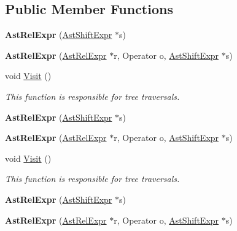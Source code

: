 \subsection*{Public Member Functions}
\begin{DoxyCompactItemize}
\item 
\hypertarget{classAstRelExpr_a17bddafe8d750f50ae41eb9c87410b1e}{{\bfseries Ast\-Rel\-Expr} (\hyperlink{classAstShiftExpr}{Ast\-Shift\-Expr} $\ast$s)}\label{classAstRelExpr_a17bddafe8d750f50ae41eb9c87410b1e}

\item 
\hypertarget{classAstRelExpr_a7a8c51e92d85456cd8da5b426f6958cf}{{\bfseries Ast\-Rel\-Expr} (\hyperlink{classAstRelExpr}{Ast\-Rel\-Expr} $\ast$r, Operator o, \hyperlink{classAstShiftExpr}{Ast\-Shift\-Expr} $\ast$s)}\label{classAstRelExpr_a7a8c51e92d85456cd8da5b426f6958cf}

\item 
void \hyperlink{classAstRelExpr_ae1a3ad7c0ce7a205222ec0b1de5ee884}{Visit} ()
\begin{DoxyCompactList}\small\item\em This function is responsible for tree traversals. \end{DoxyCompactList}\item 
\hypertarget{classAstRelExpr_a17bddafe8d750f50ae41eb9c87410b1e}{{\bfseries Ast\-Rel\-Expr} (\hyperlink{classAstShiftExpr}{Ast\-Shift\-Expr} $\ast$s)}\label{classAstRelExpr_a17bddafe8d750f50ae41eb9c87410b1e}

\item 
\hypertarget{classAstRelExpr_a7a8c51e92d85456cd8da5b426f6958cf}{{\bfseries Ast\-Rel\-Expr} (\hyperlink{classAstRelExpr}{Ast\-Rel\-Expr} $\ast$r, Operator o, \hyperlink{classAstShiftExpr}{Ast\-Shift\-Expr} $\ast$s)}\label{classAstRelExpr_a7a8c51e92d85456cd8da5b426f6958cf}

\item 
void \hyperlink{classAstRelExpr_ae1a3ad7c0ce7a205222ec0b1de5ee884}{Visit} ()
\begin{DoxyCompactList}\small\item\em This function is responsible for tree traversals. \end{DoxyCompactList}\item 
\hypertarget{classAstRelExpr_a17bddafe8d750f50ae41eb9c87410b1e}{{\bfseries Ast\-Rel\-Expr} (\hyperlink{classAstShiftExpr}{Ast\-Shift\-Expr} $\ast$s)}\label{classAstRelExpr_a17bddafe8d750f50ae41eb9c87410b1e}

\item 
\hypertarget{classAstRelExpr_a7a8c51e92d85456cd8da5b426f6958cf}{{\bfseries Ast\-Rel\-Expr} (\hyperlink{classAstRelExpr}{Ast\-Rel\-Expr} $\ast$r, Operator o, \hyperlink{classAstShiftExpr}{Ast\-Shift\-Expr} $\ast$s)}\label{classAstRelExpr_a7a8c51e92d85456cd8da5b426f6958cf}


\end{DoxyCompactItemize}
